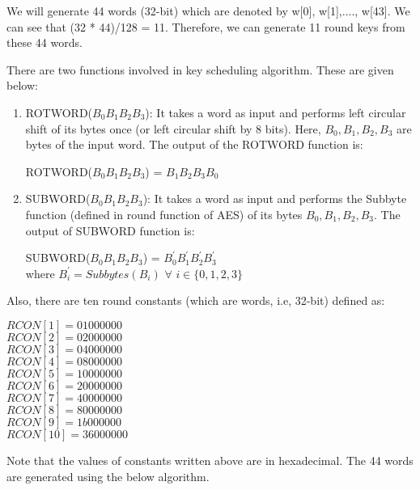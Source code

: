 \documentclass[11pt]{article}
\begin{document}
We will generate 44 words (32-bit) which are denoted by w[0], w[1],...., w[43]. We can see that (32 * 44)/128 = 11. Therefore, we can generate 11 round keys from these 44 words.

There are two functions involved in key scheduling algorithm. These are given below:
\begin{enumerate}
    \item ROTWORD($B_0B_1B_2B_3$): It takes a word as input and performs left circular shift of its bytes once (or left circular shift by 8 bits). Here, $B_0, B_1, B_2, B_3$ are bytes of the input word. The output of the ROTWORD function is:
    \begin{center}
        ROTWORD($B_0B_1B_2B_3$) = $B_1B_2B_3B_0$
    \end{center}

    \item SUBWORD($B_0B_1B_2B_3$): It takes a word as input and performs the Subbyte function (defined in round function of AES) of its bytes $B_0, B_1, B_2, B_3$. The output of SUBWORD function is:
    \begin{center}
        SUBWORD($B_0B_1B_2B_3$) = $B_0^{'} B_1^{'} B_2^{'} B_3^{'}$\\
        where $B_i^{'} = Subbytes(B_i)$ $\forall$ $i \in \{0,1,2,3\}$
    \end{center}
\end{enumerate}
Also, there are ten round constants (which are words, i.e, 32-bit) defined as:
\begin{center}
    $RCON[1] = 01000000$\\
    $RCON[2] = 02000000$\\
    $RCON[3] = 04000000$\\
    $RCON[4] = 08000000$\\
    $RCON[5] = 10000000$\\
    $RCON[6] = 20000000$\\
    $RCON[7] = 40000000$\\
    $RCON[8] = 80000000$\\
    $RCON[9] = 1b000000$\\
    $RCON[10] = 36000000$\\
\end{center}
Note that the values of constants written above are in hexadecimal. The 44 words are generated using the below algorithm.
\begin{center}
    \begin{algorithm}
    
    \end{algorithm}
\end{center}
\end{document}
